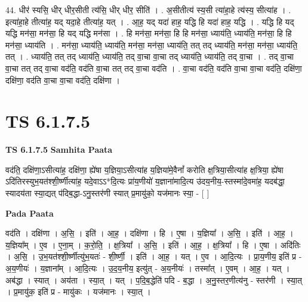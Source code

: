 \documentclass[17pt]{extarticle}
\begin{document}
44. धीर॑ स्यसि॒ धीर् धीर॒सीती त्य॑सि॒ धीर् धीर॒ सीति॑ । . अ॒सीतीत्य॑ स्य॒सी त्या॑हा॒हे त्य॑स्य॒ सीत्या॑ह । . इत्या॑हा॒हे तीत्या॑ह॒ यद् यदा॒हे तीत्या॑ह॒ यत् । . आ॒ह॒ यद् यदा॑ हाह॒ यद्धि हि यदा॑ हाह॒ यद्धि । . यद्धि हि यद् यद्धि मन॑सा॒ मन॑सा॒ हि यद् यद्धि मन॑सा । . हि मन॑सा॒ मन॑सा॒ हि हि मन॑सा॒ ध्याय॑ति॒ ध्याय॑ति॒ मन॑सा॒ हि हि मन॑सा॒ ध्याय॑ति । . मन॑सा॒ ध्याय॑ति॒ ध्याय॑ति॒ मन॑सा॒ मन॑सा॒ ध्याय॑ति॒ तत् तद् ध्याय॑ति॒ मन॑सा॒ मन॑सा॒ ध्याय॑ति॒ तत् । . ध्याय॑ति॒ तत् तद् ध्याय॑ति॒ ध्याय॑ति॒ तद् वा॒चा वा॒चा तद् ध्याय॑ति॒ ध्याय॑ति॒ तद् वा॒चा । . तद् वा॒चा वा॒चा तत् तद् वा॒चा वद॑ति॒ वद॑ति वा॒चा तत् तद् वा॒चा वद॑ति । . वा॒चा वद॑ति॒ वद॑ति वा॒चा वा॒चा वद॑ति॒ दक्षि॑णा॒ दक्षि॑णा॒ वद॑ति वा॒चा वा॒चा वद॑ति॒ दक्षि॑णा । \newline
\pagebreak
{}

\section{ TS 6.1.7.5 }

\textbf{TS 6.1.7.5 } \newline
\textbf{Samhita Paata} \newline

वद॑ति॒ दक्षि॑णा॒ऽसीत्या॑ह॒ दक्षि॑णा॒ ह्ये॑षा य॒ज्ञिया॒ऽसीत्या॑ह य॒ज्ञिया॑मे॒वैनां᳚ करोति क्ष॒त्रिया॒सीत्या॑ह क्ष॒त्रिया॒ ह्ये॑षा ऽदि॑तिरस्युभ॒यत॑श्शी॒र्ष्णीत्या॑ह॒ यदे॒वाऽऽ*दि॒त्यः प्रा॑य॒णीयो॑ य॒ज्ञाना॑मादि॒त्य उ॑दय॒नीय॒-स्तस्मा॑दे॒वमा॑ह॒ यदब॑द्धा॒ स्यादय॑ता स्या॒द्यत् प॑दिब॒द्धा-ऽनु॒स्तर॑णी स्यात् प्र॒मायु॑को॒ यज॑मानः स्या॒ - [  ] \newline

\textbf{Pada Paata} \newline

वद॑ति । दक्षि॑णा । अ॒सि॒ । इति॑ । आ॒ह॒ । दक्षि॑णा । हि । ए॒षा । य॒ज्ञिया᳚ । अ॒सि॒ । इति॑ । आ॒ह॒ । य॒ज्ञिया᳚म् । ए॒व । ए॒ना॒म् । क॒रो॒ति॒ । क्ष॒त्रिया᳚ । अ॒सि॒ । इति॑ । आ॒ह॒ । क्ष॒त्रिया᳚ । हि । ए॒षा । अदि॑तिः । अ॒सि॒ । उ॒भ॒यत॑श्शी॒र्ष्णीत्यु॑भ॒यतः॑ - शी॒र्ष्णी॒ । इति॑ । आ॒ह॒ । यत् । ए॒व । आ॒दि॒त्यः । प्रा॒य॒णीय॒ इति॑ प्र - अ॒य॒णीयः॑ । य॒ज्ञाना᳚म् । आ॒दि॒त्यः । उ॒द॒य॒नीय॒ इत्यु॑त् - अ॒य॒नीयः॑ । तस्मा᳚त् । ए॒वम् । आ॒ह॒ । यत् । अब॑द्धा । स्यात् । अय॑ता । स्या॒त् । यत् । प॒दि॒ब॒द्धेति॑ पदि - ब॒द्धा । अ॒नु॒स्तर॒णीत्य॑नु - स्तर॑णी । स्या॒त् । प्र॒मायु॑क॒ इति॑ प्र - मायु॑कः । यज॑मानः । स्या॒त् ।  \newline
\end{document}

